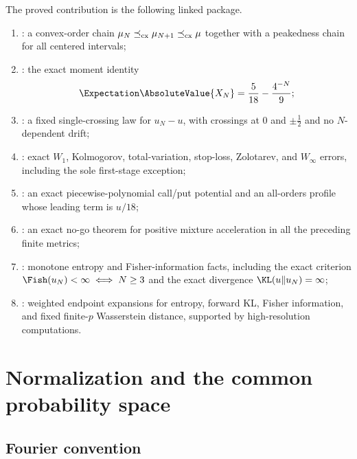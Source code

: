 \documentclass[11pt,oneside]{article}
\numberwithin{equation}{section}
\theoremstyle{definition}
\theoremstyle{remark}
\begin{document}
The proved contribution is the following linked package.

\begin{enumerate}
\item \newresult: a convex-order chain $\mu_N\preceq_{\rm cx}\mu_{N+1}\preceq_{\rm cx}\mu$ together with a peakedness chain for all centered intervals;
\item \newresult: the exact moment identity
\[
 \Expectation\AbsoluteValue{X_N}=\frac5{18}-\frac{4^{-N}}9;
\]
\item \newresult: a fixed single-crossing law for $u_N-u$, with crossings at $0$ and $\pm\tfrac12$ and no $N$-dependent drift;
\item \newresult: exact $W_1$, Kolmogorov, total-variation, stop-loss, Zolotarev, and $W_\infty$ errors, including the sole first-stage exception;
\item \newresult: an exact piecewise-polynomial call/put potential and an all-orders profile whose leading term is $u/18$;
\item \newresult: an exact no-go theorem for positive mixture acceleration in all the preceding finite metrics;
\item \newresult: monotone entropy and Fisher-information facts, including the exact criterion $\Fish(u_N)<\infty\iff N\ge3$ and the exact divergence $\KL(u\Vert u_N)=\infty$;
\item \conjstatus: weighted endpoint expansions for entropy, forward KL, Fisher information, and fixed finite-$p$ Wasserstein distance, supported by high-resolution computations.
\end{enumerate}

\section{Normalization and the common probability space}
\label{p5:sec:model}

\subsection{Fourier convention}
\end{document}
